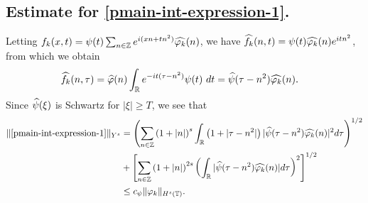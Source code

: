 \subsection{Estimate for \eqref{pmain-int-expression-1}.}
Letting $f_k(x,t) = \psi(t) \sum_{n \in \mathbb{Z}} e^{i(xn + tn^{2})} 
\widehat{\varphi_k}(n)$, we have $\widehat{f_k}(n,t) = \psi(t) \widehat{\varphi_k}(n) e^{itn^{2}}$,
from which we obtain
%
%
\begin{equation*}
  \begin{split}
    \widehat{f_k}(n, \tau)
    & = \widehat{\varphi}(n) \int_{\mathbb{R}} e^{-it( \tau - n^{2})} 
    \psi(t) \ d t
    = \widehat{\psi}(\tau - n^{2}) \widehat{\varphi_k}(n).
  \end{split}
\end{equation*}
%
%
Since $\widehat{\psi}(\xi)$ is Schwartz for $|\xi| \ge T$, we see that 
%
%
\begin{equation}
  \begin{split}
  \label{pmain-int1-est}
    \|\eqref{pmain-int-expression-1}\|_{Y^s}
    & = \left (  \sum_{n\in \mathbb{Z}} \left (1 + |n| \right )^s \int_{\mathbb{R}} \left( 1 + | \tau - n^{2} 
    | \right )
    | \widehat{\psi}(\tau - n^{2}) \widehat{\varphi_k}(n) |^2 d \tau \right)^{1/2} 
    \\
    & + \left[ \sum_{n \in \mathbb{Z} }\left( 1 + | n | \right)^{2s} \left( \int_{\mathbb{R}} |
    \widehat{\psi}(\tau - n^{2})\widehat{\varphi_k}(n) | d \tau
    \right)^{2} \right]^{1/2}
    \\
    & \le c_{\psi}
    \|\varphi_k\|_{H^s(\mathbb{T})}.
  \end{split}
\end{equation}
%
%
%
%
